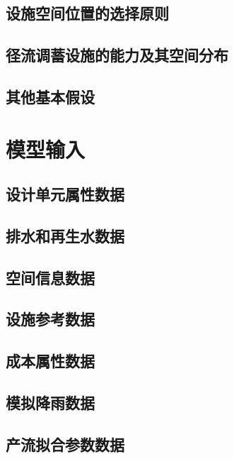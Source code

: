 \documentclass[degree=doctor]{sysuthesis}
\begin{document}
\clearpage
\setcounter{page}{67}
\subsection{设施空间位置的选择原则}

\clearpage
\setcounter{page}{68}
\subsection{径流调蓄设施的能力及其空间分布}

\clearpage
\setcounter{page}{69}
\subsection{其他基本假设}
\section{模型输入}
\subsection{设计单元属性数据}

\clearpage
\setcounter{page}{70}
\subsection{排水和再生水数据}

\clearpage
\setcounter{page}{72}
\subsection{空间信息数据}

\clearpage
\setcounter{page}{73}
\subsection{设施参考数据}

\clearpage
\setcounter{page}{74}
\subsection{成本属性数据}

\clearpage
\setcounter{page}{77}
\subsection{模拟降雨数据}
\subsection{产流拟合参数数据}
\end{document}

